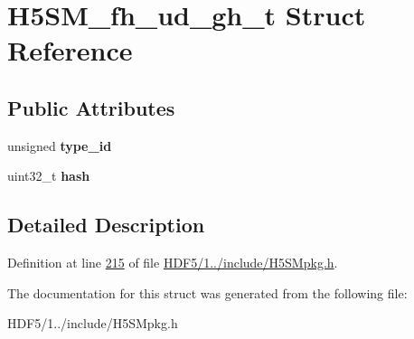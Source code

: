 \hypertarget{struct_h5_s_m__fh__ud__gh__t}{}\section{H5\+S\+M\+\_\+fh\+\_\+ud\+\_\+gh\+\_\+t Struct Reference}
\label{struct_h5_s_m__fh__ud__gh__t}
\subsection*{Public Attributes}
\begin{DoxyCompactItemize}
\item 
\mbox{\label{struct_h5_s_m__fh__ud__gh__t_a673567592c345872abc4b15892af3057}} 
unsigned {\bfseries type\+\_\+id}
\item 
\mbox{\label{struct_h5_s_m__fh__ud__gh__t_a66e8428ccea8a6120a88ddbfd676e6f8}} 
uint32\+\_\+t {\bfseries hash}
\end{DoxyCompactItemize}


\subsection{Detailed Description}


Definition at line \hyperlink{_h_d_f5_21_810_81_2include_2_h5_s_mpkg_8h_source_l00215}{215} of file \hyperlink{_h_d_f5_21_810_81_2include_2_h5_s_mpkg_8h_source}{H\+D\+F5/1../include/\+H5\+S\+Mpkg.\+h}.



The documentation for this struct was generated from the following file\+:\begin{DoxyCompactItemize}
\item 
H\+D\+F5/1../include/\+H5\+S\+Mpkg.\+h\end{DoxyCompactItemize}
